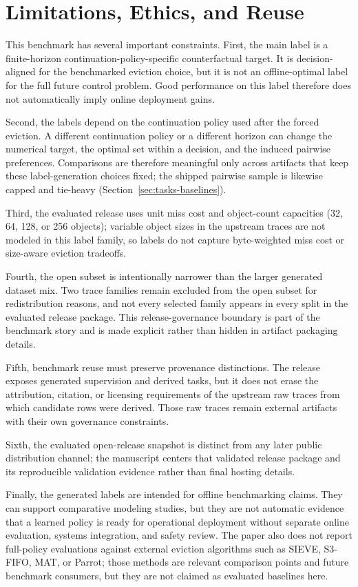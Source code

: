 \section{Limitations, Ethics, and Reuse}
\label{sec:limitations}

This benchmark has several important constraints. First, the main label is a finite-horizon continuation-policy-specific counterfactual target. It is decision-aligned for the benchmarked eviction choice, but it is not an offline-optimal label for the full future control problem. Good performance on this label therefore does not automatically imply online deployment gains.

Second, the labels depend on the continuation policy used after the forced eviction. A different continuation policy or a different horizon can change the numerical target, the optimal set within a decision, and the induced pairwise preferences. Comparisons are therefore meaningful only across artifacts that keep these label-generation choices fixed; the shipped pairwise sample is likewise capped and tie-heavy (Section~\ref{sec:tasks-baselines}).

Third, the evaluated release uses unit miss cost and object-count capacities (32, 64, 128, or 256 objects); variable object sizes in the upstream traces are not modeled in this label family, so labels do not capture byte-weighted miss cost or size-aware eviction tradeoffs.

Fourth, the open subset is intentionally narrower than the larger generated dataset mix. Two trace families remain excluded from the open subset for redistribution reasons, and not every selected family appears in every split in the evaluated release package. This release-governance boundary is part of the benchmark story and is made explicit rather than hidden in artifact packaging details.

Fifth, benchmark reuse must preserve provenance distinctions. The release exposes generated supervision and derived tasks, but it does not erase the attribution, citation, or licensing requirements of the upstream raw traces from which candidate rows were derived. Those raw traces remain external artifacts with their own governance constraints.

Sixth, the evaluated open-release snapshot is distinct from any later public distribution channel; the manuscript centers that validated release package and its reproducible validation evidence rather than final hosting details.

Finally, the generated labels are intended for offline benchmarking claims. They can support comparative modeling studies, but they are not automatic evidence that a learned policy is ready for operational deployment without separate online evaluation, systems integration, and safety review. The paper also does not report full-policy evaluations against external eviction algorithms such as SIEVE, S3-FIFO, MAT, or Parrot; those methods are relevant comparison points and future benchmark consumers, but they are not claimed as evaluated baselines here.
